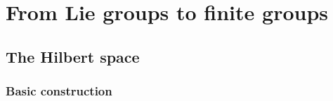 \section{From Lie groups to finite groups}
\label{sec:from_lie_groups_to_finite_groups}


\subsection{The Hilbert space}

\subsubsection{Basic construction}\label{sec:basic hilbert space}

